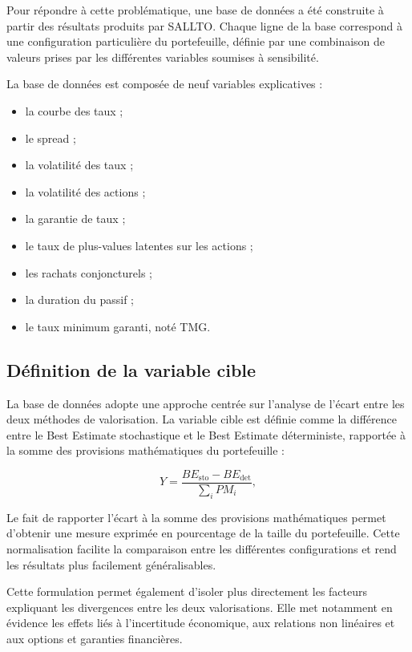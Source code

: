 Pour répondre à cette problématique, une base de données a été construite à partir des résultats produits par SALLTO. Chaque ligne de la base correspond à une configuration particulière du portefeuille, définie par une combinaison de valeurs prises par les différentes variables soumises à sensibilité.

La base de données est composée de neuf variables explicatives :

\begin{itemize}
    \renewcommand{\labelitemi}{\textbullet}
    \item la courbe des taux ;
    \item le spread ;
    \item la volatilité des taux ;
    \item la volatilité des actions ;
    \item la garantie de taux ;
    \item le taux de plus-values latentes sur les actions ;
    \item les rachats conjoncturels ;
    \item la duration du passif ;
    \item le taux minimum garanti, noté TMG.
\end{itemize}


\subsection{Définition de la variable cible}

La base de données adopte une approche centrée sur l'analyse de l'écart entre les deux méthodes de valorisation. La variable cible est définie comme la différence entre le Best Estimate stochastique et le Best Estimate déterministe, rapportée à la somme des provisions mathématiques du portefeuille :

\begin{equation}
    Y =
    \frac{BE_{\mathrm{sto}}-BE_{\mathrm{det}}}
    {\displaystyle\sum_{i} PM_i},
    \label{eq:variable_cible}
\end{equation}


Le fait de rapporter l'écart à la somme des provisions mathématiques permet d'obtenir une mesure exprimée en pourcentage de la taille du portefeuille. Cette normalisation facilite la comparaison entre les différentes configurations et rend les résultats plus facilement généralisables.

Cette formulation permet également d'isoler plus directement les facteurs expliquant les divergences entre les deux valorisations. Elle met notamment en évidence les effets liés à l'incertitude économique, aux relations non linéaires et aux options et garanties financières.

